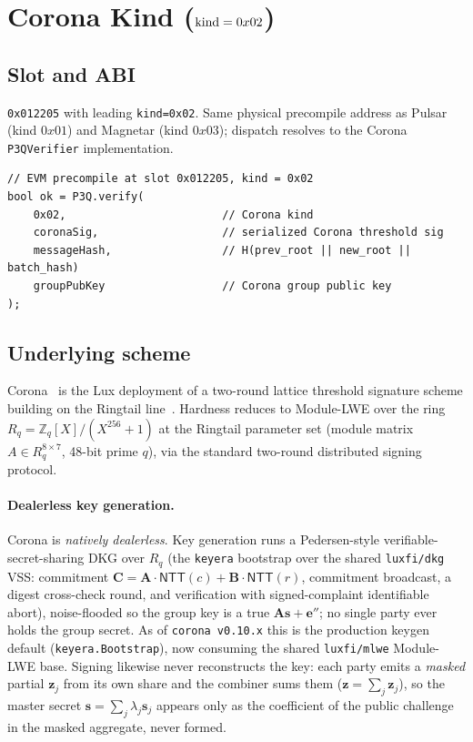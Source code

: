 \section{Corona Kind ($\textnormal{kind} = 0x02$)}
\label{sec:corona-kind}

\subsection{Slot and ABI}

\texttt{0x012205} with leading \texttt{kind=0x02}. Same physical
precompile address as Pulsar (kind $0x01$) and Magnetar
(kind $0x03$); dispatch resolves to the Corona
\texttt{P3QVerifier} implementation.

\begin{lstlisting}[language={}]
// EVM precompile at slot 0x012205, kind = 0x02
bool ok = P3Q.verify(
    0x02,                        // Corona kind
    coronaSig,                   // serialized Corona threshold sig
    messageHash,                 // H(prev_root || new_root || batch_hash)
    groupPubKey                  // Corona group public key
);
\end{lstlisting}

\subsection{Underlying scheme}

Corona~\cite{corona} is the Lux deployment of a two-round
lattice threshold signature scheme building on the Ringtail
line~\cite{ringtail}. Hardness reduces to Module-LWE over the
ring $R_q = \mathbb{Z}_q[X]/(X^{256}+1)$ at the Ringtail
parameter set (module matrix $A \in R_q^{8\times7}$, 48-bit
prime $q$), via the standard two-round distributed signing
protocol.

\paragraph{Dealerless key generation.}
Corona is \emph{natively dealerless}. Key generation runs a
Pedersen-style verifiable-secret-sharing DKG over $R_q$ (the
\texttt{keyera} bootstrap over the shared \texttt{luxfi/dkg} VSS:
commitment $\mathbf{C} = \mathbf{A}\cdot\mathsf{NTT}(c) +
\mathbf{B}\cdot\mathsf{NTT}(r)$, commitment broadcast, a digest
cross-check round, and verification with signed-complaint identifiable
abort), noise-flooded so the group key is a true $\mathbf{A}\mathbf{s} +
\mathbf{e}''$; no single party ever holds the group secret. As of
\texttt{corona v0.10.x} this is the production keygen default
(\texttt{keyera.Bootstrap}), now consuming the shared
\texttt{luxfi/mlwe} Module-LWE base. Signing likewise never reconstructs
the key: each party emits a \emph{masked} partial $\mathbf{z}_j$ from its
own share and the combiner sums them ($\mathbf{z} = \sum_j \mathbf{z}_j$),
so the master secret $\mathbf{s} = \sum_j \lambda_j \mathbf{s}_j$ appears
only as the coefficient of the public challenge in the masked aggregate,
never formed.


